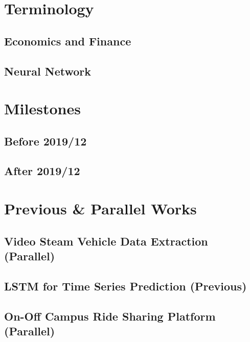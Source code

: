 \documentclass[a4paper,10pt,twoside]{report}
\begin{document}
\chapter{Terminology}\label{chapter:Terminology}

\section{Economics and Finance}
\section{Neural Network}

\chapter{Milestones}\label{chapter:Milestones}

\section{Before 2019/12}

\section{After 2019/12} 


\chapter{Previous \& Parallel Works}\label{chapter:Parallel Works}


\section{Video Steam Vehicle Data Extraction (Parallel)}


\section{LSTM for Time Series Prediction (Previous)}


\section{On-Off Campus Ride Sharing Platform (Parallel)}

\end{document}
